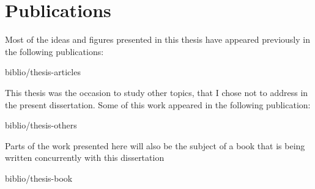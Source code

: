 

\chapter*{Publications} %

Most of the ideas and figures presented in this thesis have appeared previously in the following publications:

\smallskip


\begin{btSect}{biblio/thesis-articles}
\btPrintAll
\end{btSect}

\bigskip

This thesis was the occasion to study other topics, that I chose
not to address in the present dissertation. Some of this work appeared in the following
publication:

\smallskip


\begin{btSect}{biblio/thesis-others}
\btPrintAll
\end{btSect}

\bigskip

Parts of the work presented here will also be the subject of a book that
is being written concurrently with this dissertation

\smallskip


\begin{btSect}{biblio/thesis-book}
\btPrintAll
\end{btSect}
